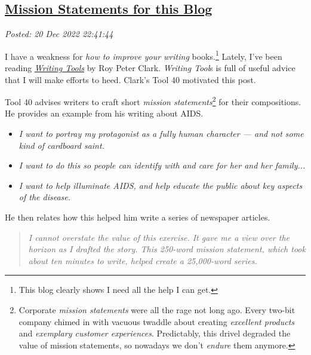 %

\subsection*{\href{http://analyzethedatanotthedrivel.org/2022/12/20/mission-statements-for-this-blog/}{Mission Statements for this Blog}}


\noindent\emph{Posted: 20 Dec 2022 22:41:44}
\vspace{6pt}

I have a weakness for \emph{how to improve your writing}
books.\footnote{This blog clearly shows I need all the help I can get.
} Lately, I've been reading
\href{https://www.amazon.com/Writing-Tools-Essential-Strategies-Writer/dp/0316014990}{\emph{Writing
Tools}} by Roy Peter Clark. \emph{Writing Tool}s is full of useful
advice that I will make efforts to heed. Clark's Tool 40 motivated this
post.

Tool 40 advises writers to craft short \emph{mission
statements}\footnote{  Corporate \emph{mission statements} were all the rage not long ago.
  Every two-bit company chimed in with vacuous twaddle about creating
  \emph{excellent products} and \emph{exemplary customer experiences}.
  Predictably, this drivel degraded the value of mission statements, so
  nowadays we don't \emph{endure} them
  anymore.} for their compositions. He provides an example from his writing about
AIDS.

\begin{itemize}
\tightlist
\item
  \emph{I want to portray my protagonist as a fully human character ---
  and not some kind of cardboard saint.}
\item
  \emph{I want to do this so people can identify with and care for her
  and her family...}
\item
  \emph{I want to help illuminate AIDS, and help educate the public
  about key aspects of the disease.}
\end{itemize}


He then relates how this helped him write a series of newspaper
articles.

\begin{quote}
\emph{I cannot overstate the value of this exercise. It gave me a view
over the horizon as I drafted the story. This 250-word mission
statement, which took about ten minutes to write, helped create a
25,000-word series.}
\end{quote}

